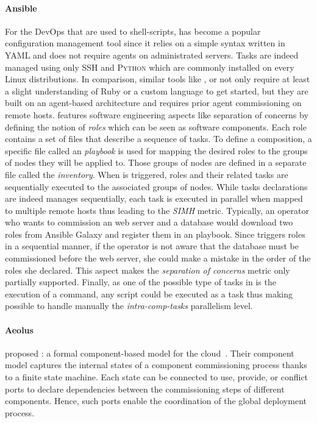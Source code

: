 \paragraph{Ansible}
For the DevOps that are used to shell-scripts, \ansible has become a
popular configuration management tool since it relies on a simple
syntax written in YAML and does not require agents on administrated
servers. Tasks are indeed managed using only \textsc{SSH} and
\textsc{Python} which are commonly installed on every Linux
distributions.  In comparison, similar tools like \chef, \puppet or
\cfengine not only require at least a slight understanding of Ruby or
a custom language to get started, but they are built on an agent-based
architecture and requires prior agent commissioning on remote hosts.
\ansible features software engineering aspects like separation of
concerns by defining the notion of \emph{roles} which can be seen as
software components.  Each role contains a set of files that describe
a sequence of tasks. To define a composition, a specific file called
an \ansible \emph{playbook} is used for mapping the desired roles to
the groups of nodes they will be applied to. Those groups of nodes are
defined in a separate file called the \emph{inventory}. When \ansible
is triggered, roles and their related tasks are sequentially executed
to the associated groups of nodes. While tasks declarations are indeed
manages sequentially, each task is executed in parallel when mapped to
multiple remote hosts thus leading to the \emph{SIMH} metric.
Typically, an operator who wants to commission an \apache web server
and a \mysql database would download two roles from Ansible Galaxy and
register them in an playbook. Since \ansible triggers roles in a
sequential manner, if the operator is not aware that the database must
be commissioned before the web server, she could make a mistake in the
order of the roles she declared. This aspect makes the
\emph{separation of concerns} metric only partially
supported. Finally, as one of the possible type of tasks in \ansible
is the execution of a \shell command, any script could be executed as
a task thus making possible to handle manually the \emph{intra-comp-tasks}
parallelism level.


\paragraph{Aeolus}
\citeauthor{dicosmo2014ic} proposed \aeolus: a formal component-based
model for the cloud~\cite{dicosmo2014ic}. Their component model
captures the internal states of a component commissioning process
thanks to a finite state machine. Each state can be connected to use,
provide, or conflict ports to declare dependencies between the
commissioning steps of different components. Hence, such ports enable
the coordination of the global deployment process.

